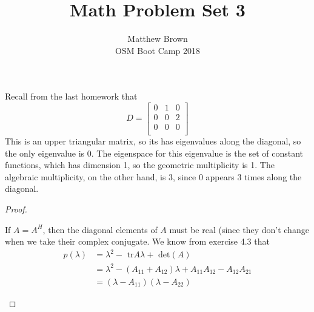 \documentclass[12pt]{article}
\newenvironment{problem}[2][Problem]{\begin{trivlist}
\item[\hskip \labelsep {\bfseries #1}\hskip \labelsep {\bfseries #2.}]}{\end{trivlist}}
\theoremstyle{definition}
\theoremstyle{definition}
\theoremstyle{definition}
\theoremstyle{definition}
\begin{document}
\title{Math Problem Set 3}
\author{Matthew Brown\\ 
OSM Boot Camp 2018} %
 
\maketitle
 
\begin{problem}{4.2}
Recall from the last homework that 
$$
D = \begin{bmatrix}
0 & 1 & 0\\
0 & 0 & 2\\
0 & 0 & 0\\
\end{bmatrix}
$$
This is an upper triangular matrix, so its has eigenvalues along the diagonal, so the only eigenvalue is 0. The eigenspace for this eigenvalue is the set of constant functions, which has dimension 1, so the geometric multiplicity is 1. The algebraic multiplicity, on the other hand, is 3, since 0 appears 3 times along the diagonal.
\end{problem}

\begin{problem}{4.4}
\begin{proof}
\begin{itemize}
If $A = A^H$, then the diagonal elements of $A$ must be real (since they don't change when we take their complex conjugate. We know from exercise 4.3 that 
\begin{align*}
p(\lambda ) &= \lambda^2 - \text{ tr}A \lambda + \text{ det}(A) \\
&= \lambda^2 - (A_{11}+A_{12}) \lambda + A_{11}A_{12} - A_{12}A_{21} \\
&= (\lambda - A_{11})(\lambda - A_{22})
\end{align*}
\end{itemize}
\end{proof}
\end{problem}

\begin{problem}{4.6}
\end{problem}

\begin{problem}{4.8}
\end{problem}

\begin{problem}{4.13}
\end{problem}

\begin{problem}{4.15}
\end{problem}
\end{document}
